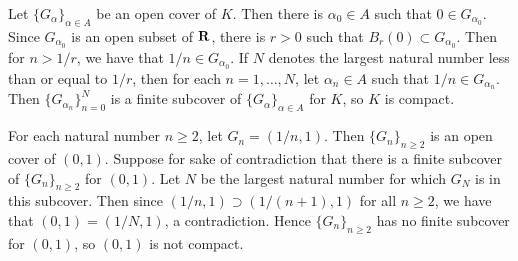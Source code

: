 \begin{ex}
Let $\{G_{\alpha}\}_{\alpha \in A}$ be an open cover of $K$. Then there is $\alpha_0 \in A$ such that $0 \in G_{\alpha_0}$. Since $G_{\alpha_0}$ is an open subset of $\mathbf{R}$, there is $r > 0$ such that $B_r(0) \subset G_{\alpha_0}$. Then for $n > 1/r$, we have that $1/n \in G_{\alpha_0}$. If $N$ denotes the largest natural number less than or equal to $1/r$, then for each $n = 1, \ldots, N$, let $\alpha_n \in A$ such that $1/n \in G_{\alpha_n}$. Then $\{G_{\alpha_n}\}_{n = 0}^N$ is a finite subcover of $\{G_{\alpha}\}_{\alpha \in A}$ for $K$, so $K$ is compact.
\end{ex}

\begin{ex}
[TODO]
\end{ex}

\begin{ex}
For each natural number $n \geq 2$, let $G_n = (1/n, 1)$. Then $\{G_n\}_{n \geq 2}$ is an open cover of $(0, 1)$. Suppose for sake of contradiction that there is a finite subcover of $\{G_n\}_{n \geq 2}$ for $(0, 1)$. Let $N$ be the largest natural number for which $G_N$ is in this subcover. Then since $(1/n, 1) \supset (1/(n+1), 1)$ for all $n \geq 2$, we have that $(0, 1) = (1/N, 1)$, a contradiction. Hence $\{G_n\}_{n \geq 2}$ has no finite subcover for $(0, 1)$, so $(0, 1)$ is not compact.
\end{ex}

\begin{ex}
[TODO]
\end{ex}

\begin{ex}
[TODO]
\end{ex}

\begin{ex}
[TODO]
\end{ex}

\begin{ex}
[TODO]
\end{ex}

